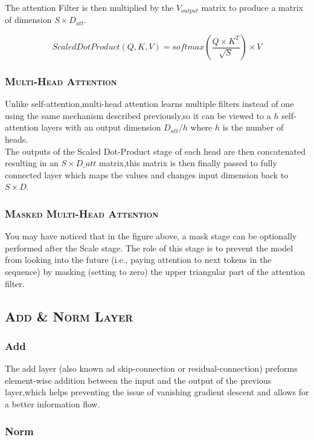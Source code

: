 \documentclass[a4paper,10pt]{article}
\begin{document}
\noindent The attention Filter is then multiplied by the $V_{output}$ matrix to produce a matrix of dimension $S \times D_{att}$.

$$
ScaledDotProduct(Q,K,V) = softmax(\frac{Q\times K^T}{\sqrt{S}}) \times V
$$

\subsubsection{\scshape{Multi-Head Attention}}

\noindent Unlike self-attention,multi-head attention learns multiple filters instead of one using the same mechanism described previously,so it can be viewed to a $h$ self-attention layers with an output dimension $D_{att} / h$ where $h$ is the number of heads.\\

\noindent The outputs of the Scaled Dot-Product stage of each head are then concatenated resulting in an $S \times D\_att$ matrix,this matrix is then finally passed to fully connected layer which maps the values and changes input dimension back to $S \times D$.

\subsubsection{\scshape{Masked Multi-Head Attention}}

\noindent You may have noticed that in the figure above, a mask stage can be optionally performed after the Scale stage. The role of this stage is to prevent the model from looking into the future (i.e., paying attention to next tokens in the sequence) by masking (setting to zero) the upper triangular part of the attention filter.

\subsection{\scshape{Add \& Norm Layer}}

\subsubsection{Add}

\noindent The add layer (also known ad skip-connection or residual-connection) preforms element-wise addition between the input and the output of the previous layer,which helps preventing the issue of vanishing gradient descent and allows for a better information flow.

\subsubsection{Norm}
\end{document}
